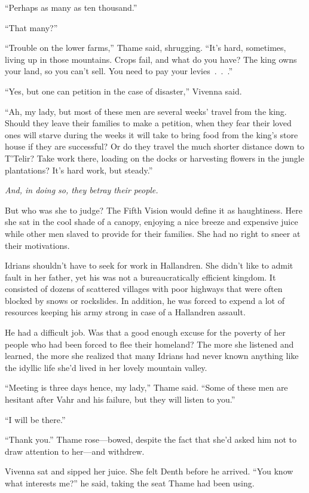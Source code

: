 “Perhaps as many as ten thousand.”

“That many?”

“Trouble on the lower farms,” Thame said, shrugging. “It’s hard, sometimes, living up in those mountains. Crops fail, and what do you have? The king owns your land, so you can’t sell. You need to pay your levies~.~.~.”

“Yes, but one can petition in the case of disaster,” Vivenna said.

“Ah, my lady, but most of these men are several weeks’ travel from the king. Should they leave their families to make a petition, when they fear their loved ones will starve during the weeks it will take to bring food from the king’s store house if they are successful? Or do they travel the much shorter distance down to T’Telir? Take work there, loading on the docks or harvesting flowers in the jungle plantations? It’s hard work, but steady.”

\textit{And, in doing so, they betray their people.}

But who was she to judge? The Fifth Vision would define it as haughtiness. Here she sat in the cool shade of a canopy, enjoying a nice breeze and expensive juice while other men slaved to provide for their families. She had no right to sneer at their motivations.

Idrians shouldn’t have to seek for work in Hallandren. She didn’t like to admit fault in her father, yet his was not a bureaucratically efficient kingdom. It consisted of dozens of scattered villages with poor highways that were often blocked by snows or rockslides. In addition, he was forced to expend a lot of resources keeping his army strong in case of a Hallandren assault.

He had a difficult job. Was that a good enough excuse for the poverty of her people who had been forced to flee their homeland? The more she listened and learned, the more she realized that many Idrians had never known anything like the idyllic life she’d lived in her lovely mountain valley.

“Meeting is three days hence, my lady,” Thame said. “Some of these men are hesitant after Vahr and his failure, but they will listen to you.”

“I will be there.”

“Thank you.” Thame rose—bowed, despite the fact that she’d asked him not to draw attention to her—and withdrew.

Vivenna sat and sipped her juice. She felt Denth before he arrived. “You know what interests me?” he said, taking the seat Thame had been using.

